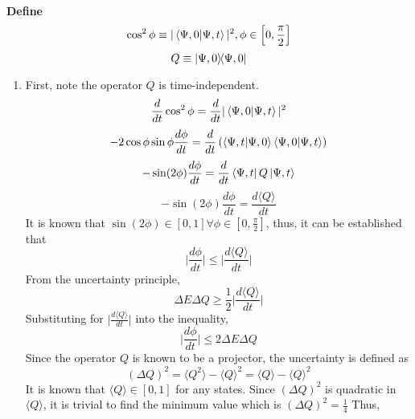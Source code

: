 \begin{sol}
\\\textbf{Define}
\begin{equation}
	\cos^2\phi\equiv|\braket{\Psi,0}{\Psi,t}|^2,\phi\in\left[0,\frac{\pi}{2}\right]
\end{equation}
\begin{equation}
	Q\equiv\ketbra{\Psi,0}{\Psi,0}
\end{equation}
\begin{enumerate}[label=\textbf{(\alph*)}]
\item
First, note the operator $Q$ is time-independent. 
\begin{equation}
	\frac{d}{dt}\cos^2\phi=\frac{d}{dt}|\braket{\Psi,0}{\Psi,t}|^2
\end{equation}
\begin{equation}
	-2\cos\phi\sin\phi\frac{d\phi}{dt}=\frac{d}{dt}\left(\braket{\Psi,t}{\Psi,0}\braket{\Psi,0}{\Psi,t}\right)
\end{equation}
\begin{equation}
	-\sin(2\phi)\frac{d\phi}{dt}=\frac{d}{dt}\bra{\Psi,t}Q\ket{\Psi,t}
\end{equation}
\begin{equation}
	-\sin(2\phi)\frac{d\phi}{dt}=\frac{d\langle Q\rangle}{dt}
\end{equation}
It is known that $\sin(2\phi)\in[0,1]\forall\phi\in\left[0,\frac{\pi}{2}\right]$, thus, it can be established that
\begin{equation}
	\bigg|\frac{d\phi}{dt}\bigg|\leq\bigg|\frac{d\langle Q\rangle}{dt}\bigg|
\end{equation}
From the uncertainty principle,
\begin{equation}
	\Delta E\Delta Q\geq\frac{1}{2}\bigg|\frac{d\langle Q\rangle}{dt}\bigg|
\end{equation}
Substituting for $\big|\frac{d\langle Q\rangle}{dt}\big|$ into the inequality,
\begin{equation}
	\bigg|\frac{d\phi}{dt}\bigg|\leq 2\Delta E\Delta Q
\end{equation}
Since the operator $Q$ is known to be a projector, the uncertainty is defined as 
\begin{equation}
	(\Delta Q)^2=\langle Q^2\rangle-\langle Q\rangle^2=\langle Q\rangle-\langle Q\rangle^2
\end{equation}
It is known that $\langle Q\rangle\in[0,1]$ for any states. Since $(\Delta Q)^2$ is quadratic in $\langle Q\rangle$, it is trivial to find the minimum value which is $(\Delta Q)^2=\frac{1}{4}$ Thus,

\end{enumerate}
\end{sol}
